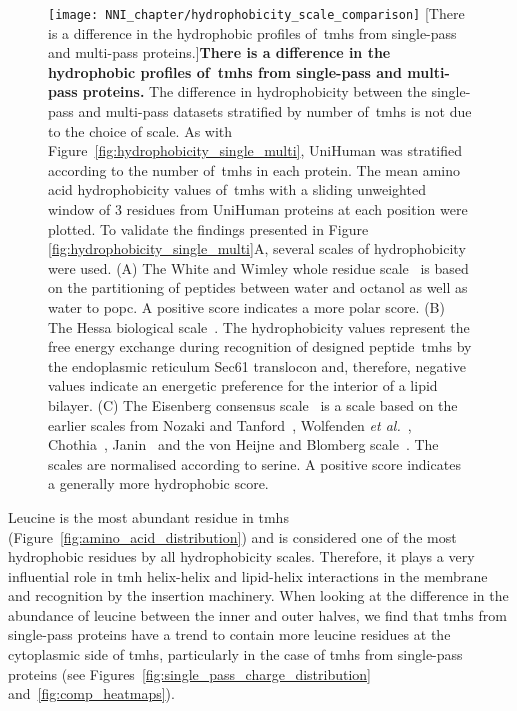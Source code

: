\begin{figure}[!ht]
\centering
\texttt{[image: NNI\_chapter/hydrophobicity\_scale\_comparison]}
[There is a difference in the hydrophobic profiles of~\gls{tmh}s from single-pass and multi-pass proteins.]{\textbf{There is a difference in the hydrophobic profiles of~\gls{tmh}s from single-pass and multi-pass proteins.}
The difference in hydrophobicity between the single-pass and multi-pass datasets stratified by number of~\gls{tmh}s is not due to the choice of scale.
As with Figure~\ref{fig:hydrophobicity_single_multi}, UniHuman was stratified according to the number of~\gls{tmh}s in each protein.
The mean amino acid hydrophobicity values of~\gls{tmh}s with a sliding unweighted window of 3 residues from UniHuman proteins at each position were plotted.
To validate the findings presented in Figure \ref{fig:hydrophobicity_single_multi}A, several scales of hydrophobicity were used.
(A) The White and Wimley whole residue scale~\cite{White1999} is based on the partitioning of peptides between water and octanol as well as water to \gls{popc}.
A positive score indicates a more polar score.
(B) The Hessa biological scale~\cite{Hessa2005}.
The hydrophobicity values represent the free energy exchange during recognition of designed peptide~\gls{tmh}s by the endoplasmic reticulum Sec61 translocon and, therefore, negative values indicate an energetic preference for the interior of a lipid bilayer.
(C) The Eisenberg consensus scale~\cite{Eisenberg1984} is a scale based on the earlier scales from Nozaki and Tanford~\cite{Nozaki1971}, Wolfenden \textit{et al.}~\cite{Wolfenden1981}, Chothia~\cite{Chothia1976}, Janin~\cite{Janin1979} and the von Heijne and Blomberg scale~\cite{VonHeijne1979}.
The scales are normalised according to serine.
A positive score indicates a generally more hydrophobic score.}

\label{fig:hydrophobicity_scale_comparison}
\end{figure}

Leucine is the most abundant residue in \gls{tmh}s (Figure~\ref{fig:amino_acid_distribution}) and is considered one of the most hydrophobic residues by all hydrophobicity scales.
Therefore, it plays a very influential role in \gls{tmh} helix-helix and lipid-helix interactions in the membrane and recognition by the insertion machinery.
When looking at the difference in the abundance of leucine between the inner and outer halves, we find that \gls{tmh}s from single-pass proteins have a trend to contain more leucine residues at the cytoplasmic side of \gls{tmh}s, particularly in the case of \gls{tmh}s from single-pass proteins (see Figures~\ref{fig:single_pass_charge_distribution} and~\ref{fig:comp_heatmaps}).

